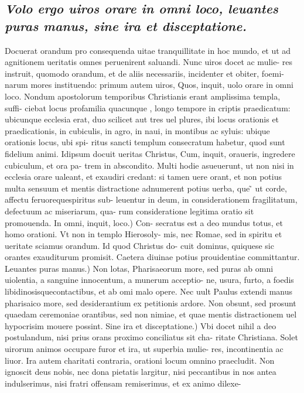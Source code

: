 \documentclass{article}
\begin{document}
\begin{pages}
\subsection*{\textit{Volo ergo uiros orare in omni loco, leuantes puras manus, sine ira et disceptatione. }}\pstart Docuerat orandum pro consequenda uitae tranquillitate in hoc mundo, et ut ad agnitionem ueritatis omnes peruenirent saluandi. Nunc uiros docet ac mulie- res instruit, quomodo orandum, et de aliis necessariis, incidenter et obiter, foemi- narum mores instituendo: primum autem uiros, Quos, inquit, uolo orare in omni loco. Nondum apostolorum temporibus Christianis erant amplissima templa, suffi- ciebat locus profamilia quacunque , longo tempore in criptis praedicatum: ubicunque  ecclesia erat, duo scilicet aut tres uel plures, ibi locus orationis et praedicationis, in cubiculis, in agro, in naui, in montibus ac syluis: ubique  orationis locus, ubi spi- ritus sancti templum consecratum habetur, quod sunt fidelium animi. Idipsum docuit ueritas Christus, Cum, inquit, oraueris, ingredere cubiculum, et ora pa- trem in abscondito. Multi hodie asueuerunt, ut non nisi in ecclesia orare ualeant, et exaudiri credant: si tamen uere orant, et non potius multa sensuum et mentis distractione adnumerent potius uerba, que ̃ ut corde, affectu feruorequespiritus sub- leuentur in deum, in considerationem fragilitatum, defectuum ac miseriarum, qua- rum consideratione legitima oratio sit promouenda. In omni, inquit, loco.) Con- secratus est a deo mundus totus, et homo orationi. Vt non in templo Hierosoly- mis, nec Romae, sed in spiritu et ueritate sciamus orandum. Id quod Christus do- cuit dominus, quiquese sic orantes exauditurum promisit. Caetera diuinae potius prouidentiae committantur. Leuantes puras manus.) Non lotas, Pharisaeorum more, sed puras ab omni uiolentia, a sanguine innocentum, a munerum acceptio- ne, usura, furto, a foedis libidinosisquecontactibus, et ab omi malo opere. Nec uult Paulus extendi manus pharisaico more, sed desiderantium ex petitionis ardore. Non obsunt, sed prosunt quaedam ceremoniae orantibus, sed non nimiae, et quae mentis distractionem uel hypocrisim mouere possint. Sine ira et disceptatione.) Vbi docet nihil a deo postulandum, nisi prius orans proximo conciliatus sit cha- ritate Christiana. Solet uirorum animos occupare furor et ira, ut superbia mulie- res, incontinentia ac liuor. Ira autem charitati contraria, orationi locum omnino praecludit. Non ignoscit deus nobis, nec dona pietatis largitur, nisi peccantibus in nos antea indulserimus, nisi fratri offensam remiserimus, et ex animo dilexe-  \pend

\end{pages}
\end{document}
